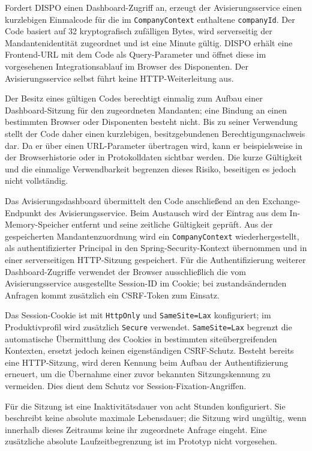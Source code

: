 Fordert DISPO einen Dashboard-Zugriff an, erzeugt der Avisierungsservice einen
kurzlebigen Einmalcode für die im \texttt{CompanyContext} enthaltene
\texttt{companyId}. Der Code basiert auf 32 kryptografisch zufälligen Bytes,
wird serverseitig der Mandantenidentität zugeordnet und ist eine Minute gültig.
DISPO erhält eine Frontend-URL mit dem Code als Query-Parameter und öffnet diese
im vorgesehenen Integrationsablauf im Browser des Disponenten. Der
Avisierungsservice selbst führt keine HTTP-Weiterleitung aus.

Der Besitz eines gültigen Codes berechtigt einmalig zum Aufbau einer
Dashboard-Sitzung für den zugeordneten Mandanten; eine Bindung an einen
bestimmten Browser oder Disponenten besteht nicht. Bis zu seiner Verwendung
stellt der Code daher einen kurzlebigen, besitzgebundenen Berechtigungsnachweis
dar. Da er über einen URL-Parameter übertragen wird, kann er beispielsweise in
der Browserhistorie oder in Protokolldaten sichtbar werden. Die kurze Gültigkeit
und die einmalige Verwendbarkeit begrenzen dieses Risiko, beseitigen es jedoch
nicht vollständig.

Das Avisierungsdashboard übermittelt den Code anschließend an den
Exchange-Endpunkt des Avisierungsservice. Beim Austausch wird der Eintrag aus
dem In-Memory-Speicher entfernt und seine zeitliche Gültigkeit geprüft. Aus der
gespeicherten Mandantenzuordnung wird ein \texttt{CompanyContext}
wiederhergestellt, als
authentifizierter Principal in den Spring-Security-Kontext übernommen und in
einer serverseitigen HTTP-Sitzung gespeichert. Für die Authentifizierung
weiterer Dashboard-Zugriffe verwendet der Browser ausschließlich die vom
Avisierungsservice ausgestellte Session-ID im Cookie; bei zustandsändernden
Anfragen kommt zusätzlich ein CSRF-Token zum Einsatz.

Das Session-Cookie ist mit \texttt{HttpOnly} und \texttt{SameSite=Lax}
konfiguriert; im Produktivprofil wird zusätzlich \texttt{Secure} verwendet.
\texttt{SameSite=Lax} begrenzt die automatische Übermittlung des Cookies in
bestimmten siteübergreifenden Kontexten, ersetzt jedoch keinen eigenständigen
CSRF-Schutz. Besteht bereits eine HTTP-Sitzung, wird deren Kennung beim Aufbau
der Authentifizierung erneuert, um die Übernahme einer zuvor bekannten
Sitzungskennung zu vermeiden. Dies dient dem Schutz vor
Session-Fixation-Angriffen.

Für die Sitzung ist eine Inaktivitätsdauer von acht Stunden konfiguriert. Sie
beschreibt keine absolute maximale Lebensdauer; die Sitzung wird ungültig, wenn
innerhalb dieses Zeitraums keine ihr zugeordnete Anfrage eingeht. Eine
zusätzliche absolute Laufzeitbegrenzung ist im Prototyp nicht vorgesehen.

